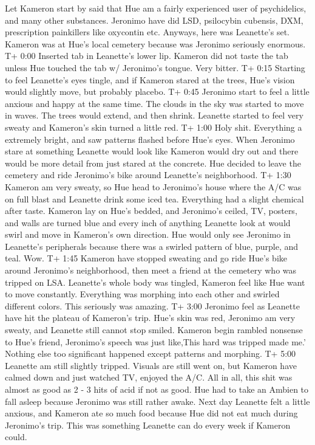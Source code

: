\documentclass[12pt]{book}
\begin{document}
Let Kameron start by said that Hue am a fairly experienced user of psychidelics, and many other substances. Jeronimo have did LSD, psilocybin cubensis, DXM, prescription painkillers like oxycontin etc. Anyways, here was Leanette's set. Kameron was at Hue's local cemetery because was Jeronimo seriously enormous. T+ 0:00 Inserted tab in Leanette's lower lip. Kameron did not taste the tab unless Hue touched the tab w/ Jeronimo's tongue. Very bitter. T+ 0:15 Starting to feel Leanette's eyes tingle, and if Kameron stared at the trees, Hue's vision would slightly move, but probably placebo. T+ 0:45 Jeronimo start to feel a little anxious and happy at the same time. The clouds in the sky was started to move in waves. The trees would extend, and then shrink. Leanette started to feel very sweaty and Kameron's skin turned a little red. T+ 1:00 Holy shit. Everything a extremely bright, and saw patterns flashed before Hue's eyes. When Jeronimo stare at something Leanette would look like Kameron would dry out and there would be more detail from just stared at the concrete. Hue decided to leave the cemetery and ride Jeronimo's bike around Leanette's neighborhood. T+ 1:30 Kameron am very sweaty, so Hue head to Jeronimo's house where the A/C was on full blast and Leanette drink some iced tea. Everything had a slight chemical after taste. Kameron lay on Hue's bedded, and Jeronimo's ceiled, TV, posters, and walls are turned blue and every inch of anything Leanette look at would swirl and move in Kameron's own direction. Hue would only see Jeronimo in Leanette's peripherals because there was a swirled pattern of blue, purple, and teal. Wow. T+ 1:45 Kameron have stopped sweating and go ride Hue's bike around Jeronimo's neighborhood, then meet a friend at the cemetery who was tripped on LSA. Leanette's whole body was tingled, Kameron feel like Hue want to move constantly. Everything was morphing into each other and swirled different colors. This seriously was amazing. T+ 3:00 Jeronimo feel as Leanette have hit the plateau of Kameron's trip. Hue's skin was red, Jeronimo am very sweaty, and Leanette still cannot stop smiled. Kameron begin rambled nonsense to Hue's friend, Jeronimo's speech was just like,This hard was tripped made me.' Nothing else too significant happened except patterns and morphing. T+ 5:00 Leanette am still slightly tripped. Visuals are still went on, but Kameron have calmed down and just watched TV, enjoyed the A/C. All in all, this shit was almost as good as 2 - 3 hits of acid if not as good. Hue had to take an Ambien to fall asleep because Jeronimo was still rather awake. Next day Leanette felt a little anxious, and Kameron ate so much food because Hue did not eat much during Jeronimo's trip. This was something Leanette can do every week if Kameron could.
\end{document}
